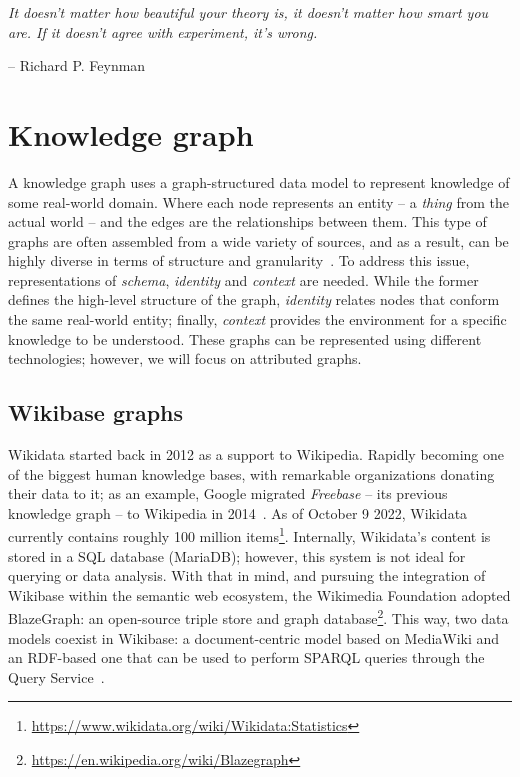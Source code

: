 \epigraph{\textit{It doesn't matter how beautiful your theory is, it doesn't matter how smart you are. If it doesn't agree with experiment, it's wrong.}}{-- \textup{Richard P. Feynman }}

\section{Knowledge graph}

A knowledge graph uses a graph-structured data model to represent knowledge of some real-world domain. Where each node represents an entity -- a \textit{thing} from the actual world -- and the edges are the relationships between them. This type of graphs are often assembled from a wide variety of sources, and as a result, can be highly diverse in terms of structure and granularity~\cite{DBLP:journals/corr/abs-2003-02320}. To address this issue, representations of \textit{schema}, \textit{identity} and \textit{context} are needed. While the former defines the high-level structure of the graph, \textit{identity} relates nodes that conform the same real-world entity; finally, \textit{context} provides the environment for a specific knowledge to be understood. These graphs can be represented using different technologies; however, we will focus on attributed graphs.

\subsection{Wikibase graphs}

Wikidata started back in 2012 as a support to Wikipedia. Rapidly becoming one of the biggest human knowledge bases, with remarkable organizations donating their data to it; as an example, Google migrated \textit{Freebase} -- its previous knowledge graph -- to Wikipedia in 2014~\cite{10.1145/2872427.2874809}. As of October 9 2022, Wikidata currently contains roughly 100 million items\footnote{\url{https://www.wikidata.org/wiki/Wikidata:Statistics}}. Internally, Wikidata's content is stored in a SQL database (MariaDB); however, this system is not ideal for querying or data analysis. With that in mind, and pursuing the integration of Wikibase within the semantic web ecosystem, the Wikimedia Foundation adopted BlazeGraph: an open-source triple store and graph database\footnote{\url{https://en.wikipedia.org/wiki/Blazegraph}}. This way, two data models coexist in Wikibase: a document-centric model based on MediaWiki and an RDF-based one that can be used to perform SPARQL queries through the Query Service~\cite{https://doi.org/10.48550/arxiv.2110.11709}.

